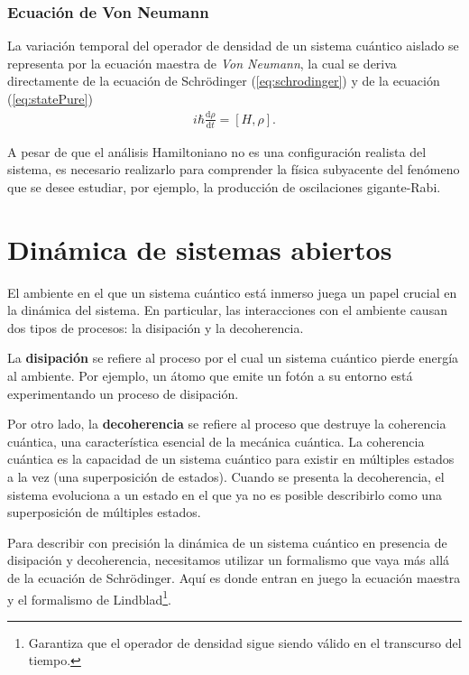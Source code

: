 \documentclass[../main.tex]{subfiles}
\begin{document}
\subsubsection{Ecuación de Von Neumann}
La variación temporal del operador de densidad de un sistema cuántico aislado se representa por la ecuación maestra de \textit{Von Neumann}, la cual se deriva directamente de la ecuación de Schrödinger (\ref{eq:schrodinger}) y de la ecuación (\ref{eq:statePure})
\begin{align}\label{eq:neumann}
	i \hbar \frac{\mathrm{d} \rho}{\mathrm{d} t} = [H,\rho].
\end{align}

A pesar de que el análisis Hamiltoniano no es una configuración realista del sistema, es necesario realizarlo para comprender la física subyacente del fenómeno que se desee estudiar, por ejemplo, la producción de oscilaciones gigante-Rabi.

\section{Dinámica de sistemas abiertos}
El ambiente en el que un sistema cuántico está inmerso juega un papel crucial en la dinámica del sistema. En particular, las interacciones con el ambiente causan dos tipos de procesos: la disipación y la decoherencia. 

La \textbf{disipación} se refiere al proceso por el cual un sistema cuántico pierde energía al ambiente. Por ejemplo, un átomo que emite un fotón a su entorno está experimentando un proceso de disipación. 

Por otro lado, la \textbf{decoherencia} se refiere al proceso que destruye la coherencia cuántica, una característica esencial de la mecánica cuántica. La coherencia cuántica es la capacidad de un sistema cuántico para existir en múltiples estados a la vez (una superposición de estados). Cuando se presenta la decoherencia, el sistema evoluciona a un estado en el que ya no es posible describirlo como una superposición de múltiples estados.

Para describir con precisión la dinámica de un sistema cuántico en presencia de disipación y decoherencia, necesitamos utilizar un formalismo que vaya más allá de la ecuación de Schrödinger. Aquí es donde entran en juego la ecuación maestra y el formalismo de Lindblad\footnote{Garantiza que el operador de densidad sigue siendo válido en el transcurso del tiempo.}.
\end{document}
